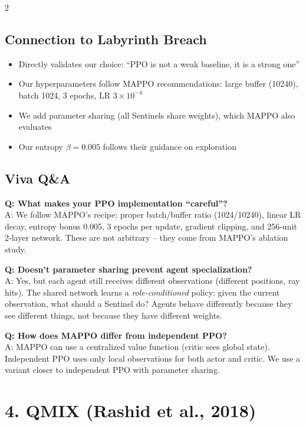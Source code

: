 \documentclass[10pt,a4paper]{article}
\begin{document}
\begin{multicols}{2}
\subsection{Connection to Labyrinth Breach}
\begin{itemize}
\item Directly validates our choice: ``PPO is not a weak baseline, it is a strong one''
\item Our hyperparameters follow MAPPO recommendations: large buffer (10240), batch 1024, 3 epochs, LR $3 \times 10^{-4}$
\item We add parameter sharing (all Sentinels share weights), which MAPPO also evaluates
\item Our entropy $\beta = 0.005$ follows their guidance on exploration
\end{itemize}

\subsection{Viva Q\&A}

\textbf{Q: What makes your PPO implementation ``careful''?} \\
A: We follow MAPPO's recipe: proper batch/buffer ratio (1024/10240), linear LR decay, entropy bonus 0.005, 3 epochs per update, gradient clipping, and 256-unit 2-layer network. These are not arbitrary -- they come from MAPPO's ablation study.

\textbf{Q: Doesn't parameter sharing prevent agent specialization?} \\
A: Yes, but each agent still receives different observations (different positions, ray hits). The shared network learns a \textit{role-conditioned} policy: given the current observation, what should a Sentinel do? Agents behave differently because they see different things, not because they have different weights.

\textbf{Q: How does MAPPO differ from independent PPO?} \\
A: MAPPO can use a centralized value function (critic sees global state). Independent PPO uses only local observations for both actor and critic. We use a variant closer to independent PPO with parameter sharing.

\section{4. QMIX (Rashid et al., 2018)}


\end{multicols}
\end{document}
